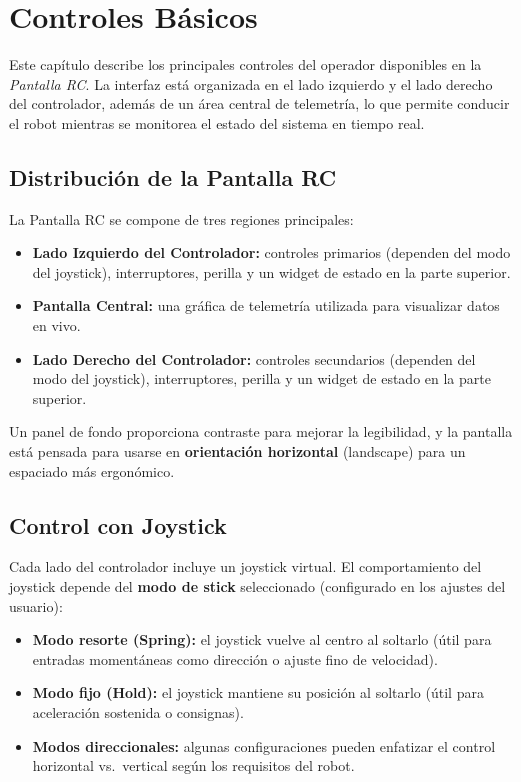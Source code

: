 \chapter{Controles Básicos}
\label{ch:basic-controls}

Este capítulo describe los principales controles del operador disponibles en la \textit{Pantalla RC}. La interfaz está organizada en el lado izquierdo y el lado derecho del controlador, además de un área central de telemetría, lo que permite conducir el robot mientras se monitorea el estado del sistema en tiempo real.

\section{Distribución de la Pantalla RC}
\label{sec:rc-layout}

La Pantalla RC se compone de tres regiones principales:

\begin{itemize}
    \item \textbf{Lado Izquierdo del Controlador:} controles primarios (dependen del modo del joystick), interruptores, perilla y un widget de estado en la parte superior.
    \item \textbf{Pantalla Central:} una gráfica de telemetría utilizada para visualizar datos en vivo.
    \item \textbf{Lado Derecho del Controlador:} controles secundarios (dependen del modo del joystick), interruptores, perilla y un widget de estado en la parte superior.
\end{itemize}

Un panel de fondo proporciona contraste para mejorar la legibilidad, y la pantalla está pensada para usarse en \textbf{orientación horizontal} (landscape) para un espaciado más ergonómico.

\section{Control con Joystick}
\label{sec:joystick-control}

Cada lado del controlador incluye un joystick virtual. El comportamiento del joystick depende del \textbf{modo de stick} seleccionado (configurado en los ajustes del usuario):

\begin{itemize}
    \item \textbf{Modo resorte (Spring):} el joystick vuelve al centro al soltarlo (útil para entradas momentáneas como dirección o ajuste fino de velocidad).
    \item \textbf{Modo fijo (Hold):} el joystick mantiene su posición al soltarlo (útil para aceleración sostenida o consignas).
    \item \textbf{Modos direccionales:} algunas configuraciones pueden enfatizar el control horizontal vs.\ vertical según los requisitos del robot.
\end{itemize}

